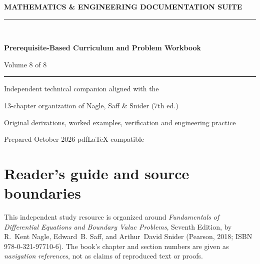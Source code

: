 \documentclass[11pt,letterpaper,oneside]{report}
\theoremstyle{definition}\newtheorem{definition}[theorem]{Definition}
\theoremstyle{remark}\newtheorem{remark}[theorem]{Remark}
\begin{document}
\begin{titlepage}
\pagecolor{navy}\color{white}
\vspace*{0.75in}
{\sffamily\bfseries\large MATHEMATICS \& ENGINEERING DOCUMENTATION SUITE\\[12pt]}
{\color{cyan!40}\rule{\textwidth}{2pt}}\\[1.0in]
{\sffamily\bfseries\fontsize{29}{36}\selectfont Prerequisite-Based Curriculum and Problem Workbook\par}
\vspace{0.45in}
{\Large Volume 8 of 8}\par\vspace{0.55in}
{\color{cyan!30}\rule{0.50\textwidth}{1pt}}\par\vspace{0.3in}
{\large Independent technical companion aligned with the\par}
{\large 13-chapter organization of Nagle, Saff \& Snider (7th ed.)\par}
\vfill
{\large Original derivations, worked examples, verification and engineering practice\par}\vspace{0.3in}
{\small Prepared October 2026 \quad\textbullet\quad pdf\LaTeX{} compatible\par}
\end{titlepage}
\nopagecolor\color{ink}
\chapter*{Reader's guide and source boundaries}
This independent study resource is organized around \emph{Fundamentals of Differential Equations and Boundary Value Problems}, Seventh Edition, by R.~Kent Nagle, Edward~B. Saff, and Arthur~David Snider (Pearson, 2018; ISBN 978-0-321-97710-6). The book's chapter and section numbers are given as \emph{navigation references}, not as claims of reproduced text or proofs.
\end{document}
